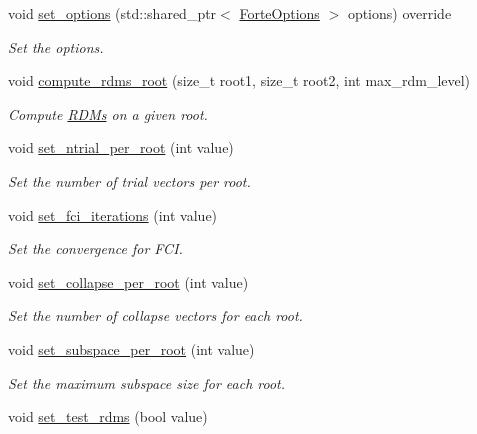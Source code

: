 \begin{DoxyCompactItemize}
\item 
void \mbox{\hyperlink{classforte_1_1_f_c_i_solver_a5bb962ea913122dbcec9319411876b05}{set\+\_\+options}} (std\+::shared\+\_\+ptr$<$ \mbox{\hyperlink{classforte_1_1_forte_options}{Forte\+Options}} $>$ options) override
\begin{DoxyCompactList}\small\item\em Set the options. \end{DoxyCompactList}\item 
void \mbox{\hyperlink{classforte_1_1_f_c_i_solver_a36c1bb8d06f2b2b28b5700c861e5acae}{compute\+\_\+rdms\+\_\+root}} (size\+\_\+t root1, size\+\_\+t root2, int max\+\_\+rdm\+\_\+level)
\begin{DoxyCompactList}\small\item\em Compute \mbox{\hyperlink{classforte_1_1_r_d_ms}{R\+D\+Ms}} on a given root. \end{DoxyCompactList}\item 
void \mbox{\hyperlink{classforte_1_1_f_c_i_solver_ab65c6c24f4f55007ff06792e444c6605}{set\+\_\+ntrial\+\_\+per\+\_\+root}} (int value)
\begin{DoxyCompactList}\small\item\em Set the number of trial vectors per root. \end{DoxyCompactList}\item 
void \mbox{\hyperlink{classforte_1_1_f_c_i_solver_abc0f14fa88b25e521394b0a31b5ea1eb}{set\+\_\+fci\+\_\+iterations}} (int value)
\begin{DoxyCompactList}\small\item\em Set the convergence for F\+CI. \end{DoxyCompactList}\item 
void \mbox{\hyperlink{classforte_1_1_f_c_i_solver_a68ac8d378e848ce9a058716095ac37d7}{set\+\_\+collapse\+\_\+per\+\_\+root}} (int value)
\begin{DoxyCompactList}\small\item\em Set the number of collapse vectors for each root. \end{DoxyCompactList}\item 
void \mbox{\hyperlink{classforte_1_1_f_c_i_solver_a412a3fe22b7b6dbacb97d42c37bd07a2}{set\+\_\+subspace\+\_\+per\+\_\+root}} (int value)
\begin{DoxyCompactList}\small\item\em Set the maximum subspace size for each root. \end{DoxyCompactList}\item 
void \mbox{\hyperlink{classforte_1_1_f_c_i_solver_acaf6732c243a888374ffe95454ea4273}{set\+\_\+test\+\_\+rdms}} (bool value)

\end{DoxyCompactItemize}
